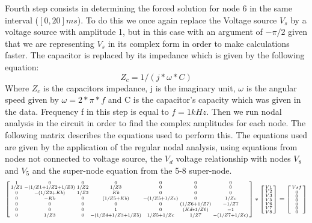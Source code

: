 Fourth step consists in determining the forced solution for node 6 in the same interval ($[0, 20]ms$). To do this we once again replace the Voltage source $V_s$ by a voltage source with amplitude 1, but in this case with an argument of $-\pi/2$ given that we are representing $V_s$ in its complex form in order to make calculations faster. The capacitor is replaced by its impedance which is given by the following equation:
\begin{equation}
Z_c=1/(j*\omega*C)
\end{equation}
Where $Z_c$ is the capacitors impedance, j is the imaginary unit, $\omega$ is the angular speed given by $\omega=2*\pi*f$ and C is the capacitor's capacity which was given in the data. Frequency f in this step is equal to $f=1kHz$.
Then we run nodal analysis in the circuit in order to find the complex amplitudes for each node. The following matrix describes the equations used to perform this. The equations used are given by the application of the regular nodal analysis, using equations from nodes not connected to voltage source, the $V_d$ voltage relationship with nodes $V_8$ and $V_5$ and the super-node equation from the 5-8 super-node.
\begin{equation}
\begin{bsmallmatrix}
1 & 0 & 0 & 0 & 0 & 0 & 0\\
1/Z1 & -(1/Z1 + 1/Z2 + 1/Z3) & 1/Z2 & 1/Z3 & 0 & 0 & 0\\
0 & -(1/Z2 + Kb) & 1/Z2 & Kb & 0 & 0 & 0\\
0 & -Kb & 0 & (1/Z5 + Kb) & -(1/Z5+1/Zc) & 0 & 1/Zc\\
0 & 0 & 0 & 0 & 0 & (1/Z6 + 1/Z7) & -1/Z7\\
0 & 0 & 0 & 1 & 0 & (Kd * 1/Z6) & -1\\
0 & 1/Z3 & 0 & -(1/Z4 + 1/Z3 + 1/Z5) & 1/Z5+1/Zc & 1/Z7 & -(1/Z7+1/Zc)\\
\end{bsmallmatrix}
*
\begin{bsmallmatrix}
V1\\V2\\V3\\V5\\V6\\V7\\V8
\end{bsmallmatrix}
=
\begin{bsmallmatrix}
Vsf\\0\\0\\0\\0\\0\\0
\end{bsmallmatrix}
\end{equation}
